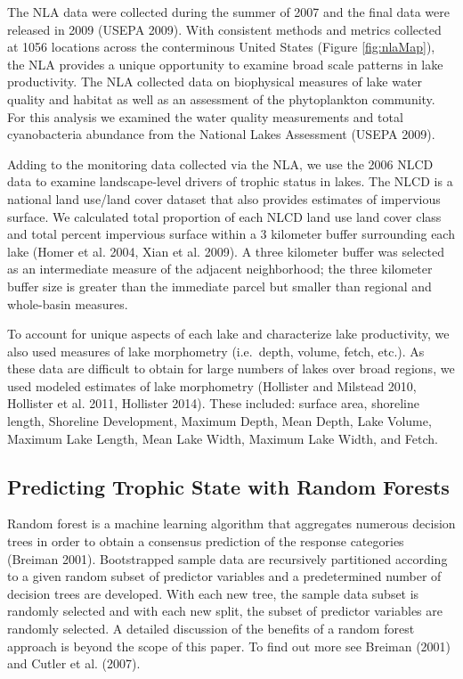 \documentclass[11pt,]{article}
\begin{document}
The NLA data were collected during the summer of 2007 and the final data
were released in 2009 (USEPA 2009). With consistent methods and metrics
collected at 1056 locations across the conterminous United States
(Figure \ref{fig:nlaMap}), the NLA provides a unique opportunity to
examine broad scale patterns in lake productivity. The NLA collected
data on biophysical measures of lake water quality and habitat as well
as an assessment of the phytoplankton community. For this analysis we
examined the water quality measurements and total cyanobacteria
abundance from the National Lakes Assessment (USEPA 2009).

Adding to the monitoring data collected via the NLA, we use the 2006
NLCD data to examine landscape-level drivers of trophic status in lakes.
The NLCD is a national land use/land cover dataset that also provides
estimates of impervious surface. We calculated total proportion of each
NLCD land use land cover class and total percent impervious surface
within a 3 kilometer buffer surrounding each lake (Homer et al. 2004,
Xian et al. 2009). A three kilometer buffer was selected as an
intermediate measure of the adjacent neighborhood; the three kilometer
buffer size is greater than the immediate parcel but smaller than
regional and whole-basin measures.

To account for unique aspects of each lake and characterize lake
productivity, we also used measures of lake morphometry (i.e.~depth,
volume, fetch, etc.). As these data are difficult to obtain for large
numbers of lakes over broad regions, we used modeled estimates of lake
morphometry (Hollister and Milstead 2010, Hollister et al. 2011,
Hollister 2014). These included: surface area, shoreline length,
Shoreline Development, Maximum Depth, Mean Depth, Lake Volume, Maximum
Lake Length, Mean Lake Width, Maximum Lake Width, and Fetch.

\subsection{Predicting Trophic State with Random
Forests}\label{predicting-trophic-state-with-random-forests}

Random forest is a machine learning algorithm that aggregates numerous
decision trees in order to obtain a consensus prediction of the response
categories (Breiman 2001). Bootstrapped sample data are recursively
partitioned according to a given random subset of predictor variables
and a predetermined number of decision trees are developed. With each
new tree, the sample data subset is randomly selected and with each new
split, the subset of predictor variables are randomly selected. A
detailed discussion of the benefits of a random forest approach is
beyond the scope of this paper. To find out more see Breiman (2001) and
Cutler et al. (2007).
\end{document}
